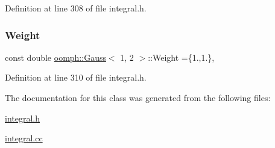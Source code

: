 Definition at line 308 of file integral.\+h.

\mbox{\label{classoomph_1_1Gauss_3_011_00_012_01_4_a5123dd00cb3e7c4a1d95a7b65a553bfc}} 
\subsubsection{\texorpdfstring{Weight}{Weight}}
{\footnotesize\ttfamily const double \hyperlink{classoomph_1_1Gauss}{oomph\+::\+Gauss}$<$ 1, 2 $>$\+::Weight =\{1.,1.\}\hspace{0.3cm}{\ttfamily [static]}, {\ttfamily [private]}}



Definition at line 310 of file integral.\+h.



The documentation for this class was generated from the following files\+:\begin{DoxyCompactItemize}
\item 
\hyperlink{integral_8h}{integral.\+h}\item 
\hyperlink{integral_8cc}{integral.\+cc}\end{DoxyCompactItemize}
